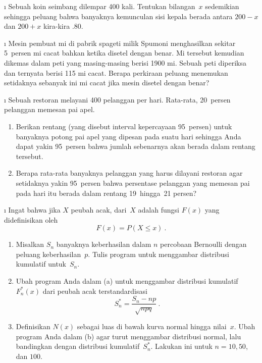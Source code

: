 \begin{LJSItem}
\i\label{exer 9.1.12}  Sebuah koin seimbang dilempar 400 kali.  Tentukan bilangan~$x$ sedemikian sehingga
peluang bahwa banyaknya kemunculan sisi kepala berada antara $200 - x$ dan $200 + x$
kira-kira .80.

\i\label{exer 9.1.13}  Mesin pembuat mi di pabrik spageti milik Spumoni menghasilkan sekitar 5~persen
mi cacat bahkan ketika disetel dengan benar.  Mi tersebut kemudian dikemas dalam
peti yang masing-masing berisi 1900 mi.  Sebuah peti diperiksa dan ternyata berisi
115 mi cacat.  Berapa perkiraan peluang menemukan setidaknya
sebanyak ini mi cacat jika mesin disetel dengan benar?

\i\label{exer 9.1.14}  Sebuah restoran melayani 400 pelanggan per hari.  Rata-rata, 20~persen
pelanggan memesan pai apel.
\begin{enumerate}
\item  Berikan rentang (yang disebut interval kepercayaan 95~persen) untuk banyaknya
potong pai apel yang dipesan pada suatu hari sehingga Anda dapat yakin 95~persen
bahwa jumlah sebenarnya akan berada dalam rentang tersebut.

\item  Berapa rata-rata banyaknya pelanggan yang harus dilayani restoran agar
setidaknya yakin 95~persen bahwa persentase pelanggan yang memesan pai pada hari itu
berada dalam rentang 19~hingga~21 persen?
\end{enumerate}

\i\label{exer 9.1.15}  Ingat bahwa jika $X$ peubah acak,  dari~$X$ adalah fungsi $F(x)$ yang didefinisikan oleh
$$
F(x) = P(X \leq x)\ .
$$
\begin{enumerate}
\item  Misalkan $S_n$ banyaknya keberhasilan dalam $n$ percobaan Bernoulli dengan
peluang keberhasilan~$p$.  Tulis program untuk menggambar distribusi kumulatif
untuk~$S_n$.

\item  Ubah program Anda dalam (a) untuk menggambar
distribusi kumulatif $F_n^*(x)$ dari peubah acak terstandardisasi
$$
S_n^* = \frac {S_n - np}{\sqrt{npq}}\ .
$$

\item  Definisikan  $N(x)$ sebagai luas di bawah
kurva normal hingga nilai~$x$.  Ubah program Anda dalam
(b) agar turut menggambar distribusi normal, lalu bandingkan
dengan distribusi kumulatif~$S_n^*$.  Lakukan ini untuk $n = 10, 50$, dan $100$.
\end{enumerate}


\end{LJSItem}
